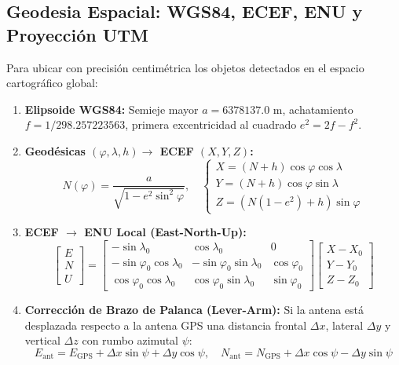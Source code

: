 \documentclass[11pt,a4paper]{article}
\begin{document}
\subsection{Geodesia Espacial: WGS84, ECEF, ENU y Proyecci{\'o}n UTM}
Para ubicar con precisi{\'o}n centim{\'e}trica los objetos detectados en el espacio cartogr{\'a}fico global:
\begin{enumerate}
    \item \textbf{Elipsoide WGS84:} Semieje mayor $a = 6378137.0\text{ m}$, achatamiento $f = 1/298.257223563$, primera excentricidad al cuadrado $e^2 = 2f - f^2$.
    \item \textbf{Geod{\'e}sicas $(\varphi, \lambda, h) \to$ ECEF $(X, Y, Z)$:}
    \begin{equation}
        N(\varphi) = \frac{a}{\sqrt{1 - e^2 \sin^2\varphi}}, \quad \begin{cases} X = (N + h)\cos\varphi\cos\lambda \\ Y = (N + h)\cos\varphi\sin\lambda \\ Z = (N(1 - e^2) + h)\sin\varphi \end{cases}
    \end{equation}
    \item \textbf{ECEF $\to$ ENU Local (East-North-Up):}
    \begin{equation}
        \begin{bmatrix} E \\ N \\ U \end{bmatrix} = \begin{bmatrix} -\sin\lambda_0 & \cos\lambda_0 & 0 \\ -\sin\varphi_0\cos\lambda_0 & -\sin\varphi_0\sin\lambda_0 & \cos\varphi_0 \\ \cos\varphi_0\cos\lambda_0 & \cos\varphi_0\sin\lambda_0 & \sin\varphi_0 \end{bmatrix} \begin{bmatrix} X - X_0 \\ Y - Y_0 \\ Z - Z_0 \end{bmatrix}
    \end{equation}
    \item \textbf{Correcci{\'o}n de Brazo de Palanca (Lever-Arm):} Si la antena est{\'a} desplazada respecto a la antena GPS una distancia frontal $\Delta x$, lateral $\Delta y$ y vertical $\Delta z$ con rumbo azimutal $\psi$:
    \begin{equation}
        E_{\text{ant}} = E_{\text{GPS}} + \Delta x \sin\psi + \Delta y \cos\psi, \quad N_{\text{ant}} = N_{\text{GPS}} + \Delta x \cos\psi - \Delta y \sin\psi
    \end{equation}
\end{enumerate}
\end{document}
